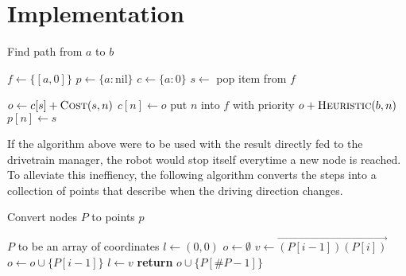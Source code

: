 \documentclass{article}
\begin{document}
\section{Implementation}


\begin{algorithm}
    \caption{Find path from $a$ to $b$}
    \begin{algorithmic}[1]
            \State $f \gets \{[a, 0]\}$ 
            \State $p \gets \{a: \mathrm{nil}\}$ 
            \State $c \gets \{a: 0\}$ 
                \State $s \gets $ pop item from $f$ 

                    \State \Return {} 
                \EndIf

                 
                    \State $o \gets c[s]+\Call{Cost}{s,n}$ 
                     
                        \State $c[n] \gets o$
                        \State put $n$ into $f$ with priority $o+\Call{Heuristic}{b,n}$
                        \State $p[n] \gets s$
                    \EndIf
                \EndFor
            \EndWhile
        \EndProcedure
    \end{algorithmic}
\end{algorithm}

If the algorithm above were to be used with the result directly fed to the drivetrain manager, the robot would stop itself everytime a new node is reached. To alleviate this ineffiency, the following algorithm converts the steps into a collection of points that describe when the driving direction changes.

\begin{algorithm}[H]
	\caption{Convert nodes $P$ to points $p$}
	\begin{algorithmic}[1]
		\Require $P$ to be an array of coordinates
			\State $l \gets (0,0)$ 
			\State $o \gets \emptyset$ 
			\For{$i$ \textbf{in} $[1,\#P)$} 
				\State $v \gets \overrightarrow{(P[i-1])(P[i])}$ 
					\State $o \gets o \cup \{P[i-1]\}$
					\State $l \gets v$
				\EndIf
			\EndFor
			\State \textbf{return} $o \cup \{P[\#P-1]\}$
		\EndProcedure
	\end{algorithmic}
\end{algorithm}
\end{document}

